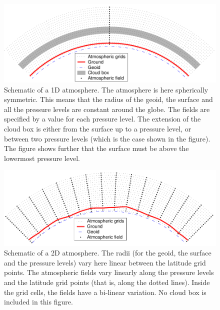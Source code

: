 \begin{figure}
 \begin{center}
  \includegraphics*[width=0.98\hsize]{atm_dim_1d}
  \caption{Schematic of a 1D atmosphere. The atmosphere is 
    here spherically symmetric. This means that the radius of the
    geoid, the surface and all the pressure levels are constant
    around the globe. The fields are specified by a value for each
    pressure level. The extension of the cloud box is either from
    the surface up to a pressure level, or between two pressure
    levels (which is the case shown in the figure). The figure shows
    further that the surface must be above the lowermost pressure
    level.}
  \label{fig:fm_defs:1d}  
 \end{center}
\end{figure}

\begin{figure}
 \begin{center}
  \includegraphics*[width=0.98\hsize]{atm_dim_2d}
  \caption{Schematic of a 2D atmosphere. The radii (for the geoid, the surface
    and the pressure levels) vary here linear between the latitude
    grid points. The atmospheric fields vary linearly along the
    pressure levels and the latitude grid points (that is, along the
    dotted lines). Inside the grid cells, the fields have a bi-linear
    variation. No cloud box is included in this figure.}
  \label{fig:fm_defs:2d}
 \end{center}
\end{figure}

